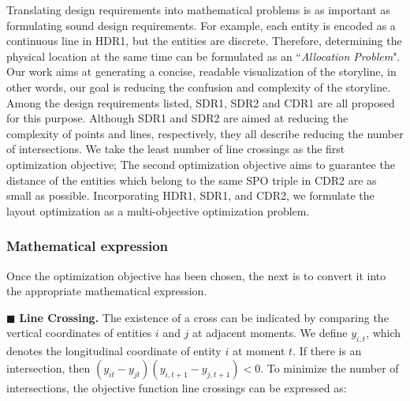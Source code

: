 \documentclass[review,journal]{vgtc}         %
\begin{document}
Translating design requirements into mathematical problems is as important as formulating sound design requirements. For example, each entity is encoded as a continuous line in HDR1, but the entities are discrete. Therefore, determining the physical location at the same time can be formulated as an ``\textit{Allocation Problem}". Our work aims at generating a concise, readable visualization of the storyline, in other words, our goal is reducing the confusion and complexity of the storyline. Among the design requirements listed, SDR1, SDR2 and CDR1 are all proposed for this purpose. Although SDR1 and SDR2 are aimed at reducing the complexity of points and lines, respectively, they all describe reducing the number of intersections. We take the least number of line crossings as the first optimization objective; The second optimization objective aims to guarantee the distance of the entities which belong to the same SPO triple in CDR2 are as small as possible. Incorporating HDR1, SDR1, and CDR2, we formulate the layout optimization as a multi-objective optimization problem.

\subsubsection{Mathematical expression}
\noindent Once the optimization objective has been chosen, the next is to convert it into the  appropriate mathematical expression.

$\blacksquare $ \textbf{Line Crossing.} The existence of a cross can be indicated by comparing the vertical coordinates of entities $i$ and $j$ at adjacent moments. We define $y_{i,t}$, which denotes the longitudinal coordinate of entity $i$ at moment $t$. If there is an intersection, then $(y_{it}-y_{jt})(y_{i,t+1}-y_{j,t+1})<0$. To minimize the number of intersections, the objective function line crossings can be expressed as:
\end{document}
